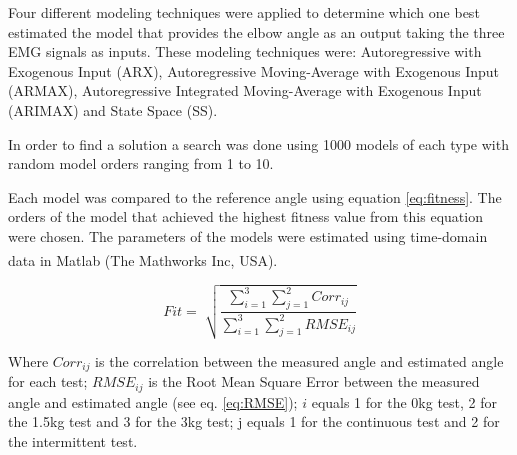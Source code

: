 \documentclass[letterpaper, 10 pt, conference]{ieeeconf}  %
\begin{document}
Four different modeling techniques were applied to determine which one best estimated the model that provides the elbow angle as an output taking the three EMG signals as inputs. These modeling techniques were: Autoregressive with Exogenous Input (ARX), Autoregressive Moving-Average with Exogenous Input (ARMAX), Autoregressive Integrated Moving-Average with Exogenous Input (ARIMAX) and State Space (SS).


In order to find a solution a search was done using 1000 models of each type with random model orders ranging from 1 to 10. 
% 
% 

% 
% 

Each model was compared to the reference angle using equation \ref{eq:fitness}. The orders of the model that achieved the highest fitness value from this equation were chosen. The parameters of the models were estimated using time-domain data in Matlab\textsuperscript{\textregistered} (The Mathworks Inc, USA).


\begin{equation}
\label{eq:fitness}
Fit = \sqrt[]{\frac{\sum_{i=1}^{3}\sum_{j=1}^{2} Corr_{ij}}{\sum_{i=1}^{3}\sum_{j=1}^{2} RMSE_{ij}}}
\end{equation}

% 
% 

% 
% 


Where $Corr_{ij}$ is the correlation between the measured angle and estimated angle for each test; $RMSE_{ij}$ is the Root Mean Square Error between the measured angle and estimated angle (see eq. \ref{eq:RMSE}); $i$ equals 1 for the 0kg test, 2 for the 1.5kg test and 3 for the 3kg test; j equals 1 for the continuous test and 2 for the intermittent test.
\end{document}

